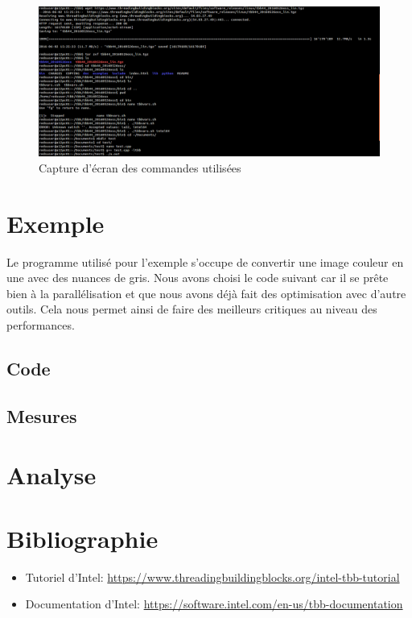 \documentclass[10pt,a4paper]{article}
\begin{document}
\begin{figure}[hpl]
	\includegraphics[width=\textwidth]{images/installcommands.png}
	\caption{Capture d'écran des commandes utilisées}
\end{figure}

\newpage

\section{Exemple}
Le programme utilisé pour l'exemple s'occupe de convertir une image couleur en une avec des nuances de gris. Nous avons choisi le code suivant car il se prête bien à la parallélisation et que nous avons déjà fait des optimisation avec d'autre outils. Cela nous permet ainsi de faire des meilleurs critiques au niveau des performances.

\subsection{Code}

\subsection{Mesures}
 
\newpage

\section{Analyse}

\newpage

\section{Bibliographie}
\begin{itemize}
	\item Tutoriel d'Intel: \url{https://www.threadingbuildingblocks.org/intel-tbb-tutorial}
	\item Documentation d'Intel: \url{https://software.intel.com/en-us/tbb-documentation}
\end{itemize}
\end{document}
